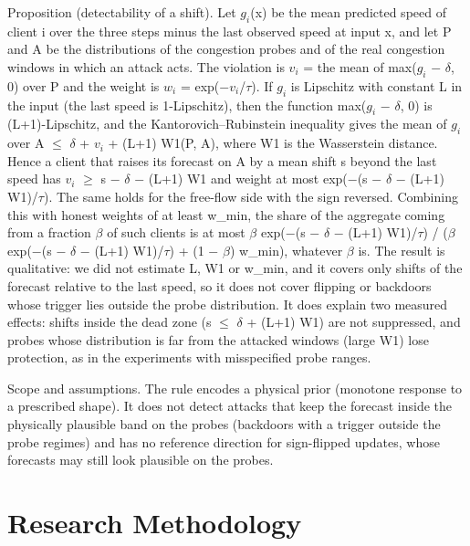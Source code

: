 \documentclass[journal]{IEEEtran}
\begin{document}
Proposition (detectability of a shift). Let $g_{i}$(x) be the mean predicted speed of client i over the three steps minus the last observed speed at input x, and let P and A be the distributions of the congestion probes and of the real congestion windows in which an attack acts. The violation is $v_{i}$ = the mean of max($g_{i}$ \ensuremath{-} \ensuremath{\delta}, 0) over P and the weight is $w_{i}$ = exp(\ensuremath{-}$v_{i}$/\ensuremath{\tau}). If $g_{i}$ is Lipschitz with constant L in the input (the last speed is 1-Lipschitz), then the function max($g_{i}$ \ensuremath{-} \ensuremath{\delta}, 0) is (L+1)-Lipschitz, and the Kantorovich--Rubinstein inequality gives the mean of $g_{i}$ over A \ensuremath{\leq} \ensuremath{\delta} + $v_{i}$ + (L+1) W1(P, A), where W1 is the Wasserstein distance. Hence a client that raises its forecast on A by a mean shift s beyond the last speed has $v_{i}$ \ensuremath{\geq} s \ensuremath{-} \ensuremath{\delta} \ensuremath{-} (L+1) W1 and weight at most exp(\ensuremath{-}(s \ensuremath{-} \ensuremath{\delta} \ensuremath{-} (L+1) W1)/\ensuremath{\tau}). The same holds for the free-flow side with the sign reversed. Combining this with honest weights of at least w\_min, the share of the aggregate coming from a fraction \ensuremath{\beta} of such clients is at most \ensuremath{\beta} exp(\ensuremath{-}(s \ensuremath{-} \ensuremath{\delta} \ensuremath{-} (L+1) W1)/\ensuremath{\tau}) / (\ensuremath{\beta} exp(\ensuremath{-}(s \ensuremath{-} \ensuremath{\delta} \ensuremath{-} (L+1) W1)/\ensuremath{\tau}) + (1 \ensuremath{-} \ensuremath{\beta}) w\_min), whatever \ensuremath{\beta} is. The result is qualitative: we did not estimate L, W1 or w\_min, and it covers only shifts of the forecast relative to the last speed, so it does not cover flipping or backdoors whose trigger lies outside the probe distribution. It does explain two measured effects: shifts inside the dead zone (s \ensuremath{\leq} \ensuremath{\delta} + (L+1) W1) are not suppressed, and probes whose distribution is far from the attacked windows (large W1) lose protection, as in the experiments with misspecified probe ranges.

Scope and assumptions. The rule encodes a physical prior (monotone response to a prescribed shape). It does not detect attacks that keep the forecast inside the physically plausible band on the probes (backdoors with a trigger outside the probe regimes) and has no reference direction for sign-flipped updates, whose forecasts may still look plausible on the probes.

\section{Research Methodology}
\end{document}
